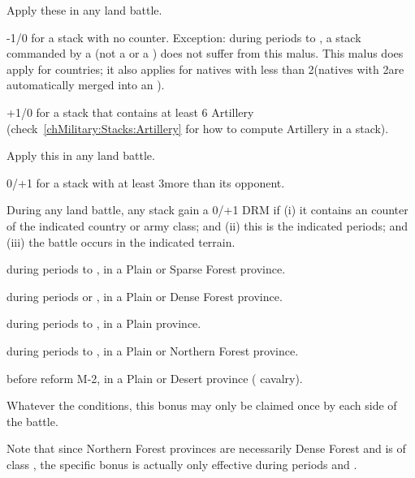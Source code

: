  Apply these in any land battle.
\begin{modlist}
\item[-1/0] for a stack with no \ARMY counter. Exception: during periods
   to , a stack commanded by a \LeaderC (not a \LeaderGov
  or a \LeaderE) does not suffer from this malus. This malus does apply for
  \ROTW countries; it also applies for natives with less than 2\LD (natives
  with 2\LD are automatically merged into an \ARMY\Facemoins).
\item[+1/0] for a stack that contains at least 6 Artillery
  (check~\ref{chMilitary:Stacks:Artillery} for how to compute Artillery in a
  stack).
\end{modlist}

 Apply this in any land battle.
\begin{modlist}
\item[0/+1] for a stack with at least 3\LD more than its opponent.
\end{modlist}

 During any land battle, any stack gain
a 0/+1 DRM if (i) it contains an \ARMY counter of the indicated country or
army class; and (ii) this is the indicated periods; and (iii) the battle
occurs in the indicated terrain.
\begin{modlist}
\item[\CAIIM] during periods  to , in a Plain or Sparse
  Forest province.
\item[\CAIIIM] during periods  or , in a Plain or Dense
  Forest province.
\item[\CAIV] during periods  to , in a Plain province.
\item[\SUE] during periods  to , in a Plain or Northern
  Forest province.
\item[\TUR] before reform M-2, in a Plain or Desert province (
  cavalry).
\end{modlist}
Whatever the conditions, this bonus may only be claimed once by each side of
the battle.

Note that since Northern Forest provinces are necessarily Dense Forest and
\SUE is of class \CAIIIM, the specific \SUE bonus is actually only effective
during periods  and .

